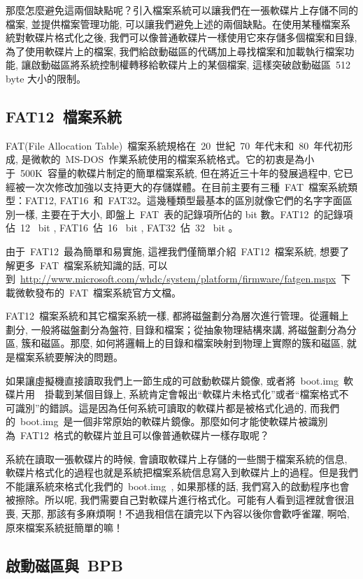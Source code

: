 那麼怎麼避免這兩個缺點呢？引入檔案系統可以讓我們在一張軟碟片上存儲不同的檔案, 並提供檔案管理功能, 可以讓我們避免上述的兩個缺點。在使用某種檔案系統對軟碟片格式化之後, 我們可以像普通軟碟片一樣使用它來存儲多個檔案和目錄, 為了使用軟碟片上的檔案, 我們給啟動磁區的代碼加上尋找檔案和加載執行檔案功能, 讓啟動磁區將系統控制權轉移給軟碟片上的某個檔案, 這樣突破啟動磁區~512~ byte 大小的限制。

\subsection{FAT12~檔案系統}

FAT(File Allocation Table)~檔案系統規格在~20~世紀~70~年代末和~80~年代初形成, 是微軟的~MS-DOS~作業系統使用的檔案系統格式。它的初衷是為小于~500K~容量的軟碟片制定的簡單檔案系統, 但在將近三十年的發展過程中, 它已經被一次次修改加強以支持更大的存儲媒體。在目前主要有三種~FAT~檔案系統類型：FAT12, FAT16~和~FAT32。這幾種類型最基本的區別就像它們的名字字面區別一樣, 主要在于大小, 即盤上~FAT~表的記錄項所佔的 bit 數。FAT12~的記錄項佔~12~ bit , FAT16~佔~16~ bit , FAT32~佔~32~ bit 。

由于~FAT12~最為簡單和易實施, 這裡我們僅簡單介紹~FAT12~檔案系統, 想要了解更多~FAT~檔案系統知識的話, 可以到~\url{http://www.microsoft.com/whdc/system/platform/firmware/fatgen.mspx}~下載微軟發布的~FAT~檔案系統官方文檔。

FAT12~檔案系統和其它檔案系統一樣, 都將磁盤劃分為層次進行管理。從邏輯上劃分, 一般將磁盤劃分為盤符, 目錄和檔案；從抽象物理結構來講, 將磁盤劃分為分區, 簇和磁區。那麼, 如何將邏輯上的目錄和檔案映射到物理上實際的簇和磁區, 就是檔案系統要解決的問題。

如果讓虛擬機直接讀取我們上一節生成的可啟動軟碟片鏡像, 或者將~boot.img~軟碟片用~~掛載到某個目錄上, 系統肯定會報出“軟碟片未格式化”或者“檔案格式不可識別”的錯誤。這是因為任何系統可讀取的軟碟片都是被格式化過的, 而我們的~boot.img~是一個非常原始的軟碟片鏡像。那麼如何才能使軟碟片被識別為~FAT12~格式的軟碟片並且可以像普通軟碟片一樣存取呢？

系統在讀取一張軟碟片的時候, 會讀取軟碟片上存儲的一些關于檔案系統的信息, 軟碟片格式化的過程也就是系統把檔案系統信息寫入到軟碟片上的過程。但是我們不能讓系統來格式化我們的~boot.img~, 如果那樣的話, 我們寫入的啟動程序也會被擦除。所以呢, 我們需要自己對軟碟片進行格式化。\blacksmiley 可能有人看到這裡就會很沮喪, 天那, 那該有多麻煩啊！不過我相信在讀完以下內容以後你會歡呼雀躍, 啊哈, 原來檔案系統挺簡單的嘛！

\subsection{啟動磁區與~BPB}

